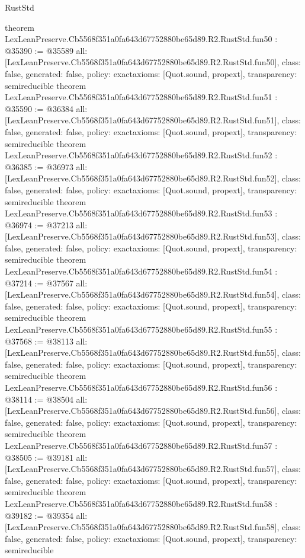 \begin{lexlean}{RustStd}
\begin{coremodule}
{}
theorem LexLeanPreserve.Cb5568f351a0fa643d67752880be65d89.R2.RustStd.fun50 : @35390 := @35589 {
  all: [LexLeanPreserve.Cb5568f351a0fa643d67752880be65d89.R2.RustStd.fun50],
  class: false,
  generated: false,
  policy: exact{axioms: [Quot.sound, propext]},
  transparency: semireducible
}
theorem LexLeanPreserve.Cb5568f351a0fa643d67752880be65d89.R2.RustStd.fun51 : @35590 := @36384 {
  all: [LexLeanPreserve.Cb5568f351a0fa643d67752880be65d89.R2.RustStd.fun51],
  class: false,
  generated: false,
  policy: exact{axioms: [Quot.sound, propext]},
  transparency: semireducible
}
theorem LexLeanPreserve.Cb5568f351a0fa643d67752880be65d89.R2.RustStd.fun52 : @36385 := @36973 {
  all: [LexLeanPreserve.Cb5568f351a0fa643d67752880be65d89.R2.RustStd.fun52],
  class: false,
  generated: false,
  policy: exact{axioms: [Quot.sound, propext]},
  transparency: semireducible
}
theorem LexLeanPreserve.Cb5568f351a0fa643d67752880be65d89.R2.RustStd.fun53 : @36974 := @37213 {
  all: [LexLeanPreserve.Cb5568f351a0fa643d67752880be65d89.R2.RustStd.fun53],
  class: false,
  generated: false,
  policy: exact{axioms: [Quot.sound, propext]},
  transparency: semireducible
}
theorem LexLeanPreserve.Cb5568f351a0fa643d67752880be65d89.R2.RustStd.fun54 : @37214 := @37567 {
  all: [LexLeanPreserve.Cb5568f351a0fa643d67752880be65d89.R2.RustStd.fun54],
  class: false,
  generated: false,
  policy: exact{axioms: [Quot.sound, propext]},
  transparency: semireducible
}
theorem LexLeanPreserve.Cb5568f351a0fa643d67752880be65d89.R2.RustStd.fun55 : @37568 := @38113 {
  all: [LexLeanPreserve.Cb5568f351a0fa643d67752880be65d89.R2.RustStd.fun55],
  class: false,
  generated: false,
  policy: exact{axioms: [Quot.sound, propext]},
  transparency: semireducible
}
theorem LexLeanPreserve.Cb5568f351a0fa643d67752880be65d89.R2.RustStd.fun56 : @38114 := @38504 {
  all: [LexLeanPreserve.Cb5568f351a0fa643d67752880be65d89.R2.RustStd.fun56],
  class: false,
  generated: false,
  policy: exact{axioms: [Quot.sound, propext]},
  transparency: semireducible
}
theorem LexLeanPreserve.Cb5568f351a0fa643d67752880be65d89.R2.RustStd.fun57 : @38505 := @39181 {
  all: [LexLeanPreserve.Cb5568f351a0fa643d67752880be65d89.R2.RustStd.fun57],
  class: false,
  generated: false,
  policy: exact{axioms: [Quot.sound, propext]},
  transparency: semireducible
}
theorem LexLeanPreserve.Cb5568f351a0fa643d67752880be65d89.R2.RustStd.fun58 : @39182 := @39354 {
  all: [LexLeanPreserve.Cb5568f351a0fa643d67752880be65d89.R2.RustStd.fun58],
  class: false,
  generated: false,
  policy: exact{axioms: [Quot.sound, propext]},
  transparency: semireducible
}
\end{coremodule}
\end{lexlean}

